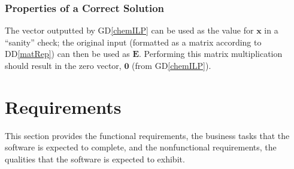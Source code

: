 \documentclass[12pt]{article}
\newcommand{\gdref}[1]{GD\ref{#1}}
\newcommand{\ddref}[1]{DD\ref{#1}}
\newcommand{\aref}[1]{A\ref{#1}}
\begin{document}
\subsubsection{Properties of a Correct Solution} \label{sec_PropsCorrSol}

The vector outputted by \gdref{chemILP} can be used as the value for
$\textbf{x}$ in a ``sanity'' check; the original input (formatted as a matrix
according to \ddref{matRep}) can then be used as $\textbf{E}$.
Performing this matrix multiplication should result in the zero vector,
$\textbf{0}$ (from \gdref{chemILP}).




\newpage

\section{Requirements}
This section provides the functional requirements, the business tasks that the
software is expected to complete, and the nonfunctional requirements, the
qualities that the software is expected to exhibit.
\end{document}
